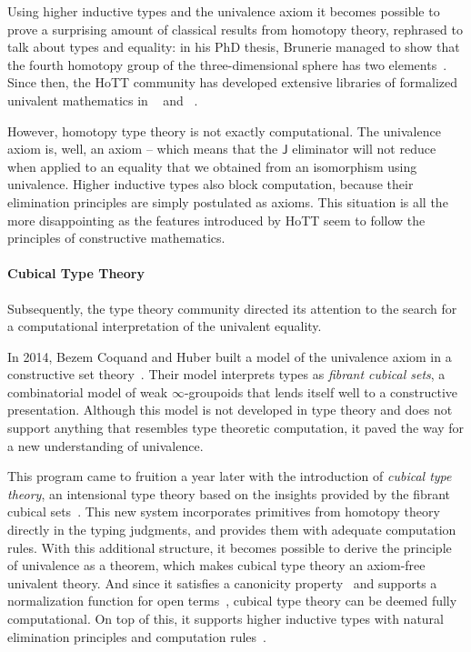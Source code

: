 Using higher inductive types and the univalence axiom it becomes possible to 
prove a surprising amount of classical results from homotopy theory, rephrased
to talk about types and equality:
% 
in his PhD thesis, Brunerie managed to show that the fourth homotopy group of
the three-dimensional sphere has two elements~.
% 
Since then, the HoTT community has developed extensive libraries of formalized
univalent mathematics in \Coq~ and
\Agda~.

However, homotopy type theory is not exactly computational. The univalence
axiom is, well, an axiom -- which means that the \( \mathsf{J} \) eliminator
will not reduce when applied to an equality that we obtained from an 
isomorphism using univalence.
% 
Higher inductive types also block computation, because their elimination 
principles are simply postulated as axioms.
% 
This situation is all the more disappointing as the features introduced by HoTT
seem to follow the principles of constructive mathematics.

\paragraph*{Cubical Type Theory}
% 
Subsequently, the type theory community directed its attention to the
search for a computational interpretation of the univalent equality. 

In 2014, Bezem Coquand and Huber built a model of the univalence axiom in a constructive 
set theory~.
% 
Their model interprets types as \emph{fibrant cubical sets}, a combinatorial
model of weak \( \infty \)-groupoids that lends itself well to a constructive
presentation.
% 
Although this model is not developed in type theory and does not support 
anything that resembles type theoretic computation, it paved the way for a new 
understanding of univalence.

This program came to fruition a year later with the introduction of 
\emph{cubical type theory}, an intensional type theory based on the insights 
provided by the fibrant cubical sets~.
% 
This new system incorporates primitives from homotopy theory directly in the typing 
judgments, and provides them with adequate computation rules.
% 
With this additional structure, it becomes possible to derive the principle of 
univalence as a theorem, which makes cubical type theory an axiom-free univalent 
theory.
% 
And since it satisfies a canonicity property~ and supports a
normalization function for open terms~, 
cubical type theory can be deemed fully computational.
% 
On top of this, it supports higher inductive types with
natural elimination principles and computation rules~.

